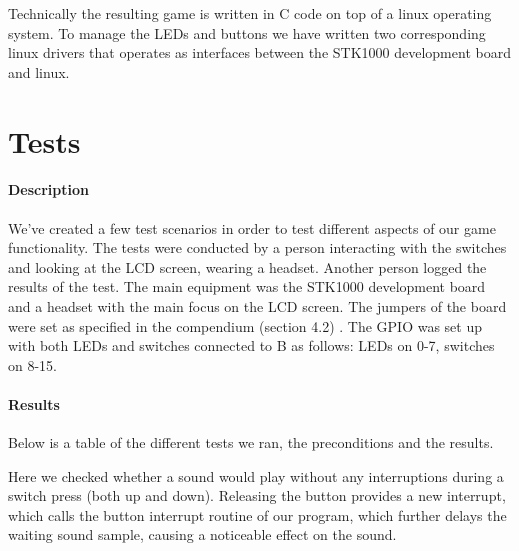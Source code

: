 \documentclass[a4paper,11pt]{article}
\begin{document}
Technically the resulting game is written in C code on top of a linux operating system. To manage the LEDs and buttons we have written two corresponding linux drivers that operates as interfaces between the STK1000 development board and linux. 


\section{Tests}
\paragraph{Description}

We've created a few test scenarios in order to test different aspects of our game functionality. The tests were conducted by a person interacting with the switches and looking at the LCD screen, wearing a headset. Another person logged the results of the test. The main equipment was the STK1000 development board and a headset with the main focus on the LCD screen. The jumpers of the board were set as specified in the compendium (section 4.2) \cite{komp}. The GPIO was set up with both LEDs and switches connected to B as follows: LEDs on 0-7, switches on 8-15. 





\paragraph{Results}
Below is a table of the different tests we ran, the preconditions and the results. 

Here we checked whether a sound would play without any interruptions during a switch press (both up and down). Releasing the button provides a new interrupt, which calls the button interrupt routine of our program, which further delays the waiting sound sample, causing a noticeable effect on the sound.
\end{document}
